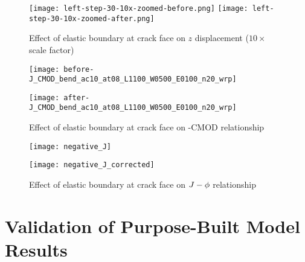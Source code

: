 \begin{figure}[tbp]
\centering
\texttt{[image: left-step-30-10x-zoomed-before.png]}
\texttt{[image: left-step-30-10x-zoomed-after.png]}
\caption{\label{fig:elastic-boundary-displacement} Effect of elastic boundary at crack face on \(z\) displacement (\(10\times\) scale factor)}
\end{figure}

\begin{figure}[tbp]
\centering
\begin{minipage}{0.45\columnwidth}
\texttt{[image: before-J\_CMOD\_bend\_ac10\_at08\_L1100\_W0500\_E0100\_n20\_wrp]}
\end{minipage}
\begin{minipage}{0.45\columnwidth}
\texttt{[image: after-J\_CMOD\_bend\_ac10\_at08\_L1100\_W0500\_E0100\_n20\_wrp]}
\end{minipage}
\caption{\label{fig:elastic-boundary-J-CMOD} Effect of elastic boundary at crack face on \J-CMOD relationship}
\end{figure}

\begin{figure}[tbp]
\centering
\begin{minipage}{0.45\columnwidth}
\texttt{[image: negative\_J]}
\end{minipage}
\begin{minipage}{0.45\columnwidth}
\texttt{[image: negative\_J\_corrected]}
\end{minipage}
\caption{\label{fig:elastic-boundary-J-phi} Effect of elastic boundary at crack face on \(J-\phi\) relationship}
\end{figure}

\section{Validation of Purpose-Built Model Results}
\label{sec:validation-purpose-built}

